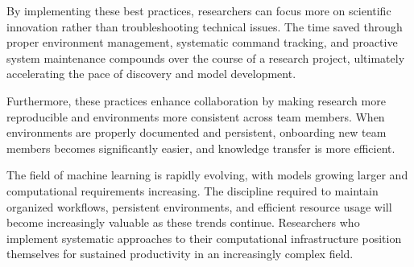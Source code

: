 \documentclass{article}
\begin{document}
By implementing these best practices, researchers can focus more on scientific innovation rather than troubleshooting technical issues. The time saved through proper environment management, systematic command tracking, and proactive system maintenance compounds over the course of a research project, ultimately accelerating the pace of discovery and model development.

Furthermore, these practices enhance collaboration by making research more reproducible and environments more consistent across team members. When environments are properly documented and persistent, onboarding new team members becomes significantly easier, and knowledge transfer is more efficient.

The field of machine learning is rapidly evolving, with models growing larger and computational requirements increasing. The discipline required to maintain organized workflows, persistent environments, and efficient resource usage will become increasingly valuable as these trends continue. Researchers who implement systematic approaches to their computational infrastructure position themselves for sustained productivity in an increasingly complex field.
\end{document}
